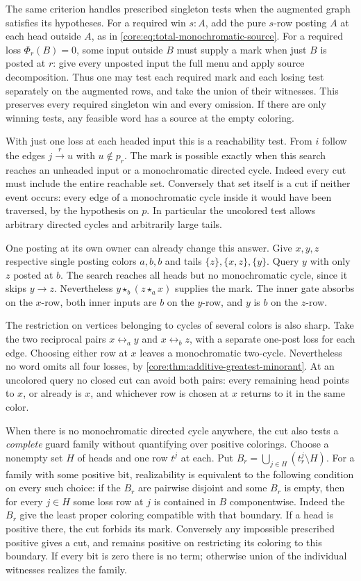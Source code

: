 The same criterion handles prescribed singleton tests when the
augmented graph satisfies its hypotheses. For a required win $s:A$,
add the pure $s$-row posting $A$ at each head outside $A$, as in
\eqref{core:eq:total-monochromatic-source}. For a required loss
$\Phi_r(B)=0$, some input outside $B$ must supply a mark when just
$B$ is posted at $r$: give every unposted input the full menu and
apply source decomposition. Thus one may test each required mark
and each losing test separately on the augmented rows, and take
the union of their witnesses. This preserves every required singleton
win and every omission. If there are only winning tests, any feasible
word has a source at the empty coloring.

With just one loss at each headed input this is a reachability test.
From $i$ follow the edges $j\xrightarrow{r}u$ with $u\notin p_r$.
The mark is possible exactly when this search reaches an unheaded
input or a monochromatic directed cycle.
Indeed every cut must include the entire reachable set. Conversely
that set itself is a cut if neither event occurs: every edge of a
monochromatic cycle inside it would have been traversed, by the
hypothesis on $p$. In particular the uncolored test allows arbitrary directed
cycles and arbitrarily large tails.

One posting at its own owner can already change this answer. Give
$x,y,z$ respective single posting colors $a,b,b$ and tails
$\{z\},\{x,z\},\{y\}$.
Query $y$ with only $z$ posted at $b$. The search reaches all heads
but no monochromatic cycle, since it skips $y\to z$. Nevertheless
$y\star_b(z\star_a x)$ supplies the mark. The inner gate absorbs
on the $x$-row, both inner inputs are $b$ on the $y$-row, and $y$
is $b$ on the $z$-row.

The restriction on vertices belonging to cycles of several colors is
also sharp. Take the two reciprocal pairs $x\leftrightarrow_a y$ and
$x\leftrightarrow_b z$, with a separate one-post loss for each edge.
Choosing either row at $x$ leaves a monochromatic two-cycle.
Nevertheless no word omits all four losses, by
\cref{core:thm:additive-greatest-minorant}. At an uncolored query
no closed cut can avoid both pairs: every remaining head points to
$x$, or already is $x$, and whichever row is chosen at $x$ returns
to it in the same color.

When there is no monochromatic directed cycle anywhere, the cut
also tests a \emph{complete} guard family without quantifying over
positive colorings. Choose a nonempty set $H$ of heads and one row
$t^j$ at each. Put $B_r=\bigcup_{j\in H}(t^j_r\setminus H)$.
For a family with some positive bit, realizability is equivalent to
the following condition on every such choice: if the $B_r$ are pairwise disjoint and
some $B_r$ is empty, then for every $j\in H$ some loss row at $j$
is contained in $B$ componentwise. Indeed the $B_r$ give the least proper
coloring compatible with that boundary. If a head is positive there,
the cut forbids its mark. Conversely any impossible prescribed
positive gives a cut, and remains positive on restricting its
coloring to this boundary. If every bit is zero there is no term;
otherwise union of the individual witnesses realizes the family.

